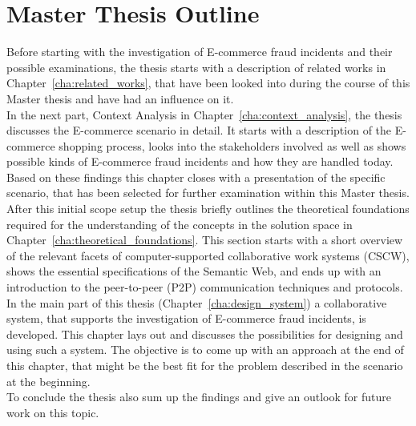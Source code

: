 
\section{Master Thesis Outline}
\label{sec:thesis_outline}

Before starting with the investigation of \gls{E-commerce} fraud incidents and their possible examinations, the thesis starts with a description of related works in Chapter~\ref{cha:related_works}, that have been looked into during the course of this Master thesis and have had an influence on it. \\

In the next part, Context Analysis in Chapter~\ref{cha:context_analysis}, the thesis discusses the \gls{E-commerce} scenario in detail. It starts with a description of the \gls{E-commerce} shopping process, looks into the stakeholders involved as well as shows possible kinds of \gls{E-commerce} fraud incidents and how they are handled today. Based on these findings this chapter closes with a presentation of the specific scenario, that has been selected for further examination within this Master thesis. \\

After this initial scope setup the thesis briefly outlines the theoretical foundations required for the understanding of the concepts in the solution space in Chapter~\ref{cha:theoretical_foundations}. This section starts with a short overview of the relevant facets of computer-supported collaborative work systems (\gls{CSCW}), shows the essential specifications of the Semantic Web, and ends up with an introduction to the peer-to-peer (\gls{P2P}) communication techniques and protocols. \\

In the main part of this thesis (Chapter~\ref{cha:design_system}) a collaborative system, that supports the investigation of \gls{E-commerce} fraud incidents, is developed. This chapter lays out and discusses the possibilities for designing and using such a system. The objective is to come up with an approach at the end of this chapter, that might be the best fit for the problem described in the scenario at the beginning. \\

To conclude the thesis also sum up the findings and give an outlook for future work on this topic.

